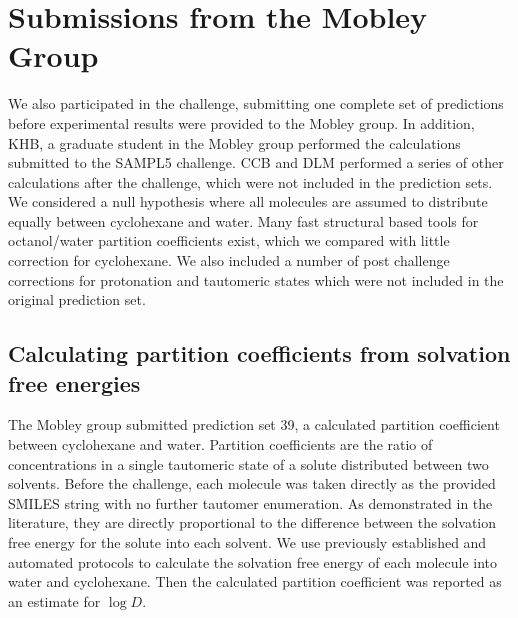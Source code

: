 
\section{Submissions from the Mobley Group}
\label{methods:1}


We also participated in the challenge, submitting one complete set of predictions before experimental results were provided to the Mobley group. 
In addition, KHB, a graduate student in the Mobley group performed the calculations submitted to the SAMPL5 challenge. 
CCB and DLM performed a series of other calculations after the challenge, which were not included in the prediction sets. 
We considered a null hypothesis where all molecules are assumed to distribute equally between cyclohexane and water.
Many fast structural based tools for octanol/water partition coefficients exist, which we compared with little correction for cyclohexane. 
We also included a number of post challenge corrections for protonation and tautomeric states which were not included in the original prediction set. 

\subsection{Calculating partition coefficients from solvation free energies}
\label{methods:2}
The Mobley group submitted prediction set 39, a calculated partition coefficient between cyclohexane and water. 
Partition coefficients are the ratio of concentrations in a single tautomeric state of a solute distributed between two solvents. 
Before the challenge, each molecule was taken directly as the provided SMILES string with no further tautomer enumeration.
As demonstrated in the literature, %
they are directly proportional to the difference between the solvation free energy for the solute into each solvent. 
We use previously established and automated protocols to calculate the solvation free energy of each molecule into water and cyclohexane. 
Then the calculated partition coefficient was reported as an estimate for $\log D$. 

